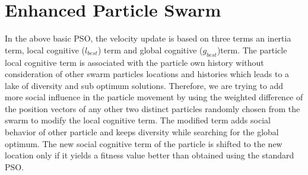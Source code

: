 \documentclass[preprint,1p,times,review]{elsarticle}
\begin{document}
\section{Enhanced Particle Swarm}
\label{sec:EnhancedSwarmAlgorithm}

In the above basic PSO, the velocity update is based on three terms an inertia term, local cognitive ($l_{best}$) term and global cognitive ($g_{best}$)term. The particle local cognitive term is associated with the particle own history without consideration of other swarm particles locations and histories which leads to a lake of diversity and sub optimum solutions. Therefore, we are trying to add more social influence in the particle movement by using the weighted difference of the position vectors of any other two distinct particles randomly chosen from the swarm to modify the local cognitive term. The modified term adds social behavior of other particle and keeps diversity while searching for the global optimum. The new social cognitive term of the particle is shifted to the new location only if it yields a fitness value better than obtained using the standard PSO\cite{stockPaper}.
\end{document}
